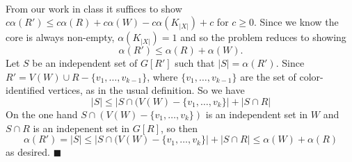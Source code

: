\documentclass[letterpaper,12pt,oneside,onecolumn]{article}
\begin{document}
\paragraph{}
From our work in class it suffices to show $c\alpha(R') \leq c\alpha(R) + c\alpha(W) - c\alpha(K_{|X|}) + c$ for $c \geq 0$. Since we know the core is always non-empty, $\alpha(K_{|X|}) = 1$ and so the problem reduces to showing
$$\alpha(R') \leq \alpha(R) + \alpha(W).$$
Let $S$ be an independent set of $G[R']$ such that $|S| = \alpha(R')$. Since $R'= V(W) \cup R - \{v_1, \dots, v_{k-1}\}$, where $\{v_1, \dots, v_{k-1}\}$ are the set of color-identified vertices, as in the usual definition. So we have
$$|S| \leq |S\cap (V(W) - \{v_1, \dots, v_k\}| + |S\cap R|$$
On the one hand $S\cap (V(W) - \{v_1, \dots, v_k\})$ is an independent set in $W$ and $S \cap R$ is an indepenent set in $G[R]$, so then
$$ \alpha(R') = |S| \leq |S\cap (V(W) - \{v_1, \dots, v_k\}| + |S\cap R| \leq \alpha(W) + \alpha(R)$$
as desired. $\blacksquare$
\end{document}
